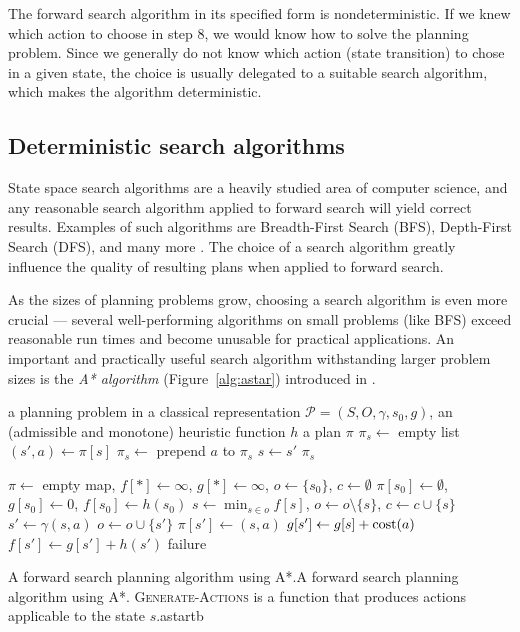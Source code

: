 The forward search algorithm in its specified form is nondeterministic.
If we knew which action to choose in step 8,
we would know how to solve the planning problem.
Since we generally do not know which action (state transition) to chose in a given state, the choice is usually delegated to a suitable
search algorithm, which makes the algorithm deterministic.


\subsection{Deterministic search algorithms}


State space search algorithms are a heavily studied area
of computer science, and any reasonable search algorithm applied
to forward search will yield correct results.
Examples of such algorithms are Breadth-First Search (BFS), 
Depth-First Search (DFS), and many more \citep[Section~3.5]{Russell1995}.
The choice of a search algorithm greatly influence
the quality of resulting plans when applied to forward search.

As the sizes of planning problems grow,
choosing a search algorithm is even more crucial ---
several well-performing algorithms on small problems (like BFS)
exceed reasonable run times and become unusable for practical applications.
An important and practically useful search algorithm
withstanding larger problem sizes is the \textit{A* algorithm} (Figure~\ref{alg:astar})
introduced in \citet{Hart1968}.

%
{%
\Input a planning problem in a classical representation $\mathcal{P} = (S, O, \gamma, s_0, g)$,
an (admissible and monotone) heuristic function $h$
\Output a plan $\pi$
\State $\pi_s \gets $ empty list
	\State $(s', a) \gets \pi[s]$
	\State $\pi_s \gets$ prepend $a$ to $\pi_s$
	\State $s \gets s'$
\EndWhile
\State \Return $\pi_s$
\EndFunction

\State $\pi \gets $ empty map, $f[*] \gets \infty$, $g[*] \gets \infty$, $o \gets \{s_0\}$, $c \gets \emptyset$
\State $\pi[s_0] \gets \emptyset$, 
$g[s_0] \gets 0$, $f[s_0] \gets h(s_0)$
\State $s \gets \min_{s \in o} f[s]$, $o \gets o \setminus \{s\}$, $c \gets c \cup \{s\}$
 \Return {} \EndIf
{}
	\State $s' \gets \gamma(s, a)$
	 
		 $o \gets o \cup \{s'\}$  \EndIf 
		 
			\State $\pi[s'] \gets (s, a)$
			\State $g[s'] \gets g[s] + \textrm{cost}(a)$
			\State $f[s'] \gets g[s'] + h(s')$
		\EndIf
	\EndIf
\EndFor
\EndWhile
\Return failure
\EndFunction
}%
{A forward search planning algorithm using A*.}{A forward search planning algorithm using A*.
\textsc{Generate-Actions} is a function that produces actions applicable to the state $s$.}{astar}{tb}

